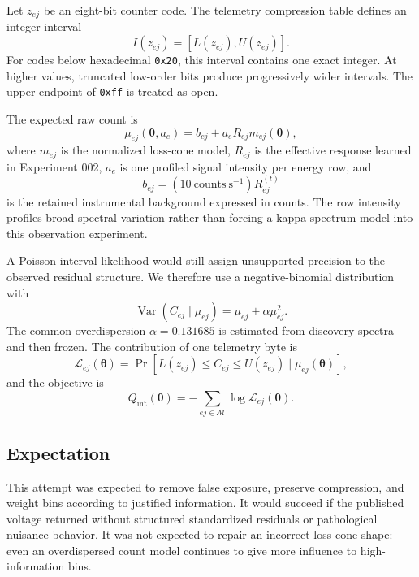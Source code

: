 \documentclass[11pt]{article}
\newcommand{\code}[1]{\texttt{#1}}
\begin{document}
Let $z_{ej}$ be an eight-bit counter code.  The telemetry compression table
defines an integer interval
\begin{equation}
  I(z_{ej})=[L(z_{ej}),U(z_{ej})].
\end{equation}
For codes below hexadecimal \code{0x20}, this interval contains one exact
integer.  At higher values, truncated low-order bits produce progressively
wider intervals.  The upper endpoint of \code{0xff} is treated as open.

The expected raw count is
\begin{equation}
  \mu_{ej}(\boldsymbol\theta,a_e)=b_{ej}
  +a_e R_{ej}m_{ej}(\boldsymbol\theta),
  \label{eq:countmean}
\end{equation}
where $m_{ej}$ is the normalized loss-cone model, $R_{ej}$ is the effective
response learned in Experiment 002, $a_e$ is one profiled signal intensity per
energy row, and
\begin{equation}
  b_{ej}=(10~\mathrm{counts~s}^{-1})R^{(t)}_{ej}
\end{equation}
is the retained instrumental background expressed in counts.  The row intensity
profiles broad spectral variation rather than forcing a kappa-spectrum model
into this observation experiment.

A Poisson interval likelihood would still assign unsupported precision to the
observed residual structure.  We therefore use a negative-binomial distribution
with
\begin{equation}
  \operatorname{Var}(C_{ej}\mid\mu_{ej})
  =\mu_{ej}+\alpha\mu_{ej}^2.
\end{equation}
The common overdispersion $\alpha=0.131685$ is estimated from discovery spectra
and then frozen.  The contribution of one telemetry byte is
\begin{equation}
  \mathcal L_{ej}(\boldsymbol\theta)
  =\Pr\!\left[L(z_{ej})\le C_{ej}\le U(z_{ej})
  \mid\mu_{ej}(\boldsymbol\theta)\right],
\end{equation}
and the objective is
\begin{equation}
  Q_{\mathrm{int}}(\boldsymbol\theta)
  =-\sum_{ej\in\mathcal M}\log\mathcal L_{ej}(\boldsymbol\theta).
\end{equation}

\subsection{Expectation}

This attempt was expected to remove false exposure, preserve compression, and
weight bins according to justified information.  It would succeed if the
published voltage returned without structured standardized residuals or
pathological nuisance behavior.  It was not expected to repair an incorrect
loss-cone shape: even an overdispersed count model continues to give more
influence to high-information bins.
\end{document}
